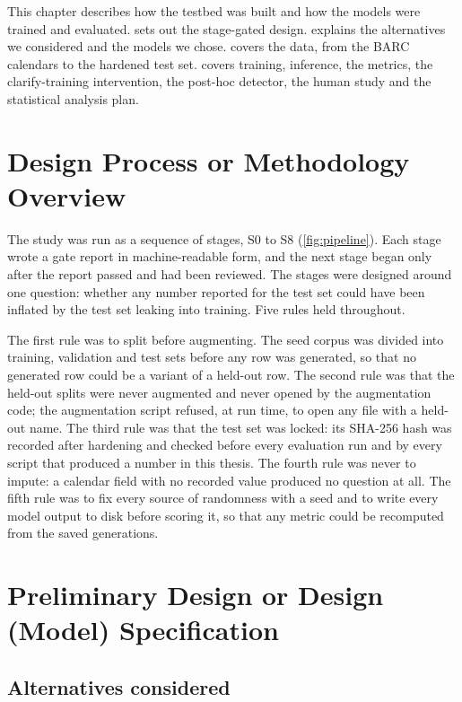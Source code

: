 This chapter describes how the testbed was built and how the models were trained and evaluated.  sets out the stage-gated design.  explains the alternatives we considered and the models we chose.  covers the data, from the BARC calendars to the hardened test set.  covers training, inference, the metrics, the clarify-training intervention, the post-hoc detector, the human study and the statistical analysis plan.

\section{Design Process or Methodology Overview}
\label{sec:design-process}

The study was run as a sequence of stages, S0 to S8 (\cref{fig:pipeline}). Each stage wrote a gate report in machine-readable form, and the next stage began only after the report passed and had been reviewed. The stages were designed around one question: whether any number reported for the test set could have been inflated by the test set leaking into training. Five rules held throughout.

The first rule was to split before augmenting. The seed corpus was divided into training, validation and test sets before any row was generated, so that no generated row could be a variant of a held-out row. The second rule was that the held-out splits were never augmented and never opened by the augmentation code; the augmentation script refused, at run time, to open any file with a held-out name. The third rule was that the test set was locked: its SHA-256 hash was recorded after hardening and checked before every evaluation run and by every script that produced a number in this thesis. The fourth rule was never to impute: a calendar field with no recorded value produced no question at all. The fifth rule was to fix every source of randomness with a seed and to write every model output to disk before scoring it, so that any metric could be recomputed from the saved generations.

\section{Preliminary Design or Design (Model) Specification}
\label{sec:preliminary-design}

\subsection{Alternatives considered}
\label{sec:alternatives}

